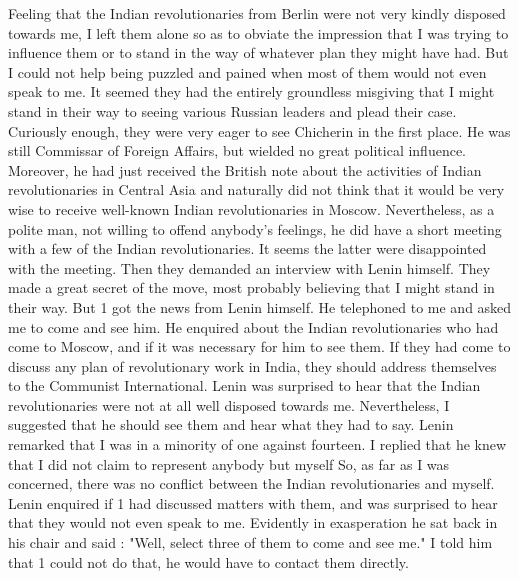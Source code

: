 Feeling that the Indian revolutionaries from Berlin were not very kindly disposed towards me, I left them alone so as to obviate the impression that I was trying to influence them or to stand in the way of whatever plan they might have had. But I could not help being puzzled and pained when most of them would not even speak to me. It seemed they had the entirely groundless misgiving that I might stand in their way to seeing various Russian leaders and plead their case. Curiously enough, they were very eager to see Chicherin in the first place. He was still Commissar of Foreign Affairs, but wielded no great political influence. Moreover, he had just received the British note about the activities of Indian revolutionaries in Central Asia and naturally did not think that it would be very wise to receive well-known Indian revolutionaries in Moscow. Nevertheless, as a polite man, not willing to offend anybody's feelings, he did have a short meeting with a few of the Indian revolutionaries. It seems the latter were disappointed with the meeting. Then they demanded an interview with Lenin himself. They made a great secret of the move, most probably believing that I might stand in their way. But 1 got the news from Lenin himself. He telephoned to me and asked me to come and see him. He enquired about the Indian revolutionaries who had come to Moscow, and if it was necessary for him to see them. If they had come to discuss any plan of revolutionary work in India, they should address themselves 
to the Communist International. Lenin was surprised to hear that the Indian revolutionaries were not at all well disposed towards me. Nevertheless, I suggested that he should see them 
and hear what they had to say. Lenin remarked that I was in a minority of one against fourteen. I replied that he knew that I did not claim to represent anybody but myself So, as far as I was concerned, there was no conflict between the Indian revolutionaries and myself. Lenin enquired if 1 had discussed matters with them, and was surprised to hear that they would not even speak to me. Evidently in exasperation he sat back in his chair and said : "Well, select three of them to come and see me." I told him that 1 could not do that, he would have to contact them directly. 

